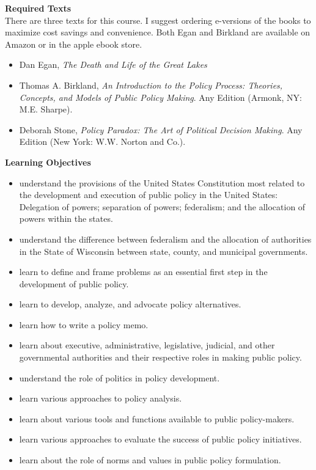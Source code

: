 \documentclass[12pt]{article}
\begin{document}
\noindent \Large \textbf{Required Texts}\normalsize\\

\noindent There are three texts for this course.  I suggest ordering e-versions of the books to maximize cost savings and convenience.  Both Egan and Birkland are available on Amazon or in the apple ebook store.%

\begin{itemize}
\item Dan Egan, \textit{The Death and Life of the Great Lakes}
\item Thomas A. Birkland, \textit{An Introduction to the Policy Process: Theories, Concepts, and Models of Public Policy Making}. Any Edition (Armonk, NY: M.E. Sharpe).
\item Deborah Stone, \textit{Policy Paradox: The Art of Political Decision Making}. Any Edition (New York: W.W. Norton and Co.).
\end{itemize}

\noindent \Large \textbf{Learning Objectives}\normalsize\\
\begin{itemize}
\item understand the provisions of the United States Constitution most related to the development and execution of public policy in the United States:  Delegation of powers; separation of powers; federalism; and the allocation of powers within the states.
\item understand the difference between federalism and the allocation of authorities in the State of Wisconsin between state, county, and municipal governments.
\item learn to define and frame problems as an essential first step in the development of public policy.
\item learn to develop, analyze, and advocate policy alternatives.
\item learn how to write a policy memo.
\item learn about executive, administrative, legislative, judicial, and other governmental authorities and their respective roles in making public policy.
\item understand the role of politics in policy development.
\item learn various approaches to policy analysis.
\item learn about various tools and functions available to public policy-makers.
\item learn various approaches to evaluate the success of public policy initiatives.
\item learn about the role of norms and values in public policy formulation.
\end{itemize}
\end{document}
